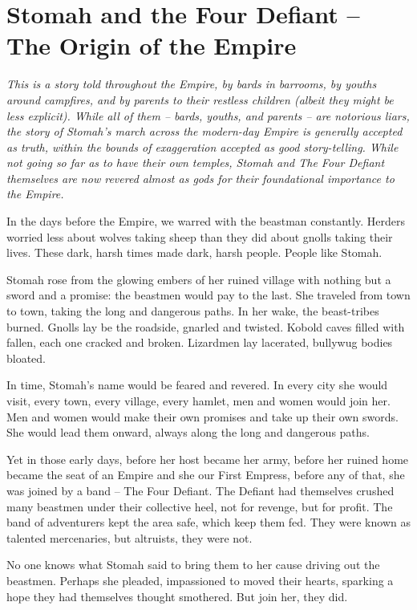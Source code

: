 \section{Stomah and the Four Defiant -- The Origin of the Empire}

\textit{This is a story told throughout the Empire, by bards in barrooms, by youths around
  campfires, and by parents to their restless children (albeit they might be less explicit).
While all of them -- bards, youths, and parents -- are notorious liars, the story of Stomah's
  march across the modern-day Empire is generally accepted as truth, within the bounds of
  exaggeration accepted as good story-telling.
While not going so far as to have their own temples, Stomah and The Four Defiant themselves are now
  revered almost as gods for their foundational importance to the Empire.}

\medskip

In the days before the Empire, we warred with the beastman constantly.
Herders worried less about wolves taking sheep than they did about gnolls taking their lives.
These dark, harsh times made dark, harsh people.
People like Stomah.

Stomah rose from the glowing embers of her ruined village with nothing but a sword and a promise:
  the beastmen would pay to the last.
She traveled from town to town, taking the long and dangerous paths.
In her wake, the beast-tribes burned.
Gnolls lay be the roadside, gnarled and twisted.
Kobold caves filled with fallen, each one cracked and broken.
Lizardmen lay lacerated, bullywug bodies bloated.

In time, Stomah's name would be feared and revered.
In every city she would visit, every town, every village, every hamlet,
  men and women would join her.
Men and women would make their own promises and take up their own swords.
She would lead them onward, always along the long and dangerous paths.

Yet in those early days, before her host became her army, before her ruined home became the seat of
  an Empire and she our First Empress, before any of that, she was joined by a band
  -- The Four Defiant.
The Defiant had themselves crushed many beastmen under their collective heel,
  not for revenge, but for profit.
The band of adventurers kept the area safe, which keep them fed.
They were known as talented mercenaries, but altruists, they were not.

No one knows what Stomah said to bring them to her cause driving out the beastmen.
Perhaps she pleaded, impassioned to moved their hearts, sparking a hope they had themselves
  thought smothered.
But join her, they did.

